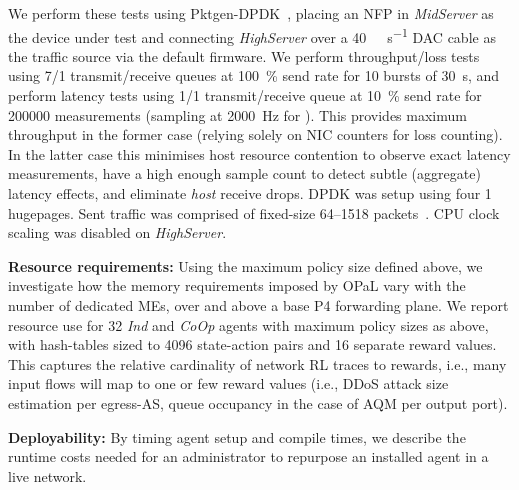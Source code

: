 \documentclass[
sigconf,natbib=false
]{acmart}
\newcommand{\fakepara}[1]{\noindent\textbf{#1:}}
\newcommand{\approachshort}{OPaL}
\newcommand{\Coopfw}{\emph{CoOp}}
\newcommand{\Indfw}{\emph{Ind}}
\begin{document}
We perform these tests using Pktgen-DPDK~\cite{pktgen-dpdk}, placing an NFP in \emph{MidServer} as the device under test and connecting \emph{HighServer} over a \SI{40}{\giga\bit\per\second} DAC cable as the traffic source via the default firmware.
We perform throughput/loss tests using \num{7}/\num{1} transmit/receive queues at \SI{100}{\percent} send rate for 10 bursts of \SI{30}{\second}, and perform latency tests using \num{1}/\num{1} transmit/receive queue at \SI{10}{\percent} send rate for \num{200000} measurements (sampling at \SI{2000}{\hertz} for ).
This provides maximum throughput in the former case (relying solely on NIC counters for loss counting).
In the latter case this minimises host resource contention to observe exact latency measurements, have a high enough sample count to detect subtle (aggregate) latency effects, and eliminate \emph{host} receive drops.
DPDK was setup using four \SI{1}{\gibi\byte} hugepages.
Sent traffic was comprised of fixed-size \SIrange{64}{1518}{\byte} packets~\cite{rfc2544}.
CPU clock scaling was disabled on \emph{HighServer}.

\fakepara{Resource requirements}
Using the maximum policy size defined above, we investigate how the memory requirements imposed by \approachshort{} vary with the number of dedicated MEs, over and above a base P4 forwarding plane.
We report resource use for \SI{32}{\bit} \Indfw{} and \Coopfw{} agents with maximum policy sizes as above, with hash-tables sized to \num{4096} state-action pairs and \num{16} separate reward values.
This captures the relative cardinality of network RL traces to rewards, i.e., many input flows will map to one or few reward values (i.e., DDoS attack size estimation per egress-AS, queue occupancy in the case of AQM per output port).


\fakepara{Deployability}
By timing agent setup and compile times, we describe the runtime costs needed for an administrator to repurpose an installed agent in a live network.
\end{document}
